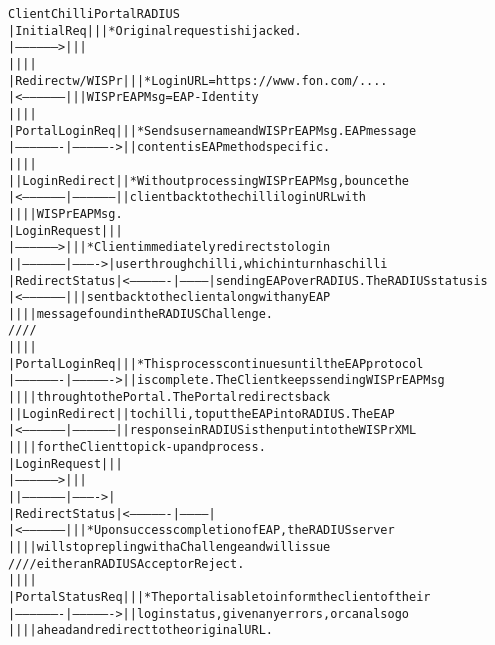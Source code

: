 \begin{alltt}\small

Client              Chilli            Portal      RADIUS
  |Initial Req        |                 |           |   * Original request is hijacked.
  |------------------>|                 |           |
  |                   |                 |           |
  |   Redirect w/WISPr|                 |           |   * LoginURL = https://www.fon.com/....
  |<------------------|                 |           |     WISPrEAPMsg = EAP-Identity
  |                   |                 |           |
  |Portal Login Req   |                 |           |   * Sends username and WISPrEAPMsg. EAP message
  |-------------------|---------------->|           |     content is EAP method specific.
  |                   |                 |           |
  |                   |   Login Redirect|           |   * Without processing WISPrEAPMsg, bounce the 
  |<------------------|-----------------|           |     client back to the chilli login URL with 
  |                   |                 |           |     WISPrEAPMsg.
  |Login Request      |                 |           |
  |------------------>|                 |           |   * Client immediately redirects to login
  |                   |-----------------|---------->|     user through chilli, which in turn has chilli
  |    Redirect Status|<----------------|-----------|     sending EAP over RADIUS. The RADIUS status is 
  |<------------------|                 |           |     sent back to the client along with any EAP 
  |                   |                 |           |     message found in the RADIUS Challenge.
  /                   /                 /           /
  |                   |                 |           |
  |Portal Login Req   |                 |           |   * This process continues until the EAP protocol 
  |-------------------|---------------->|           |     is complete. The Client keeps sending WISPrEAPMsg 
  |                   |                 |           |     through to the Portal. The Portal redirects back 
  |                   |   Login Redirect|           |     to chilli, to put the EAP into RADIUS. The EAP 
  |<------------------|-----------------|           |     response in RADIUS is then put into the WISPr XML
  |                   |                 |           |     for the Client to pick-up and process. 
  |Login Request      |                 |           |     
  |------------------>|                 |           |       
  |                   |-----------------|---------->|       
  |    Redirect Status|<----------------|-----------|
  |<------------------|                 |           |   * Upon success completion of EAP, the RADIUS server 
  |                   |                 |           |     will stop repling with a Challenge and will issue 
  /                   /                 /           /     either an RADIUS Accept or Reject.
  |                   |                 |           |
  |Portal Status Req  |                 |           |   * The portal is able to inform the client of their
  |-------------------|---------------->|           |     login status, given any errors, or can also go
  |                   |                 |           |     ahead and redirect to the original URL.
\end{alltt}
